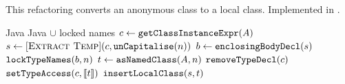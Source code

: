 \subsection{}
This refactoring converts an anonymous class to a local class. Implemented in .

\begin{algorithm}
\caption{$\refactoring{Convert Anonymous to Local}(A : \type{AnonymousClass}, n : \type{Name}) : \type{LocalClass}$}
\begin{algorithmic}[1]
\REQUIRE Java
\ENSURE Java $\cup$ locked names
\medskip
\STATE $c \leftarrow \text{\texttt{getClassInstanceExpr}}(A)$
\STATE $s \leftarrow [\textsc{Extract Temp}](c, \text{\texttt{unCapitalise}}(n))$
\STATE $b \leftarrow \text{\texttt{enclosingBodyDecl}}(s)$
\STATE $\text{\texttt{lockTypeNames}}(b, n)$
\STATE $t \leftarrow \text{\texttt{asNamedClass}}(A, n)$
\STATE $\text{\texttt{removeTypeDecl}}(c)$
\STATE $\text{\texttt{setTypeAccess}}(c, \llbracket t\rrbracket)$
\RETURN $\text{\texttt{insertLocalClass}}(s, t)$
\end{algorithmic}
\end{algorithm}
